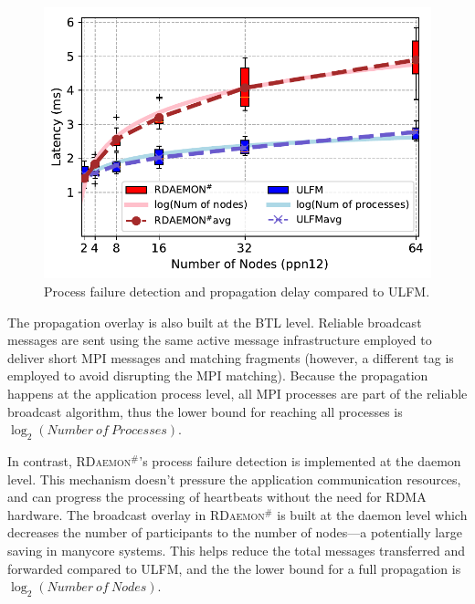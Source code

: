 \documentclass[sigconf]{acmart}
\newcommand{\ulfm}[0]{\textsc{ULFM}\xspace}
\newcommand{\mpi}[0]{\textsc{MPI}\xspace}
\newcommand{\ourwork}[0]{\textsc{RDaemon}\ensuremath{^\#}\xspace}
\begin{document}
\begin{figure}[h]
  \centering
  \includegraphics[width=\linewidth]{Process_Failure_log_fit.pdf}
  \caption{Process failure detection and propagation delay compared to \ulfm.}
  \label{fig:proc_failure_nacl}
\end{figure}

The propagation overlay is also built at the BTL level. Reliable broadcast
messages are sent using the same active message infrastructure employed to
deliver short \mpi messages and matching fragments (however, a different
tag is employed to avoid disrupting the \mpi matching). Because the
propagation happens at the application process level, all \mpi processes
are part of the reliable broadcast algorithm, thus the lower bound for reaching
all processes is $\log_2({Number\ of\ Processes})$.

In contrast, \ourwork's process failure detection is implemented at the daemon
level. This mechanism doesn't pressure the application communication resources,
and can progress the processing of heartbeats without the need for
RDMA hardware. The broadcast overlay in \ourwork is built at the daemon
level which decreases the number of participants to the number of nodes---a potentially
large saving in manycore systems. This helps reduce
the total messages transferred and forwarded compared to \ulfm, and the
 the lower bound for a full propagation is $\log_2({Number\ of\ Nodes})$.
\end{document}
